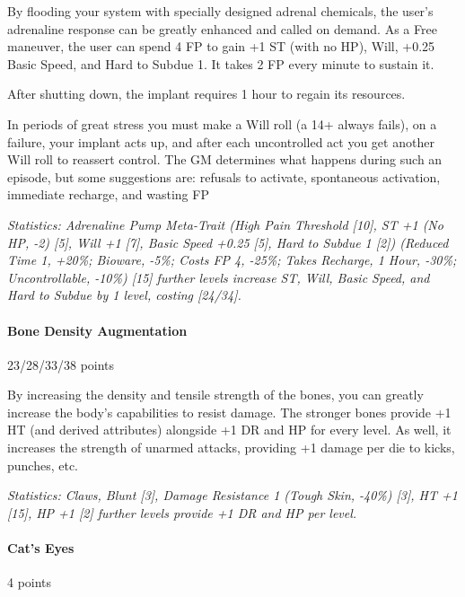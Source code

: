 \begin{multicols*}{3}
	By flooding your system with specially designed adrenal chemicals, the user's adrenaline response can be greatly enhanced and called on demand. As a Free maneuver, the user can spend 4 FP to gain +1 ST (with no HP), Will, +0.25 Basic Speed, and Hard to Subdue 1. It takes 2 FP every minute to sustain it. 
	
	After shutting down, the implant requires 1 hour to regain its resources. 
	
	In periods of great stress you  must make a Will roll (a 14+ always fails), on a failure, your implant acts up, and after each uncontrolled act you get another Will roll to reassert control. The GM determines what happens during such an episode, but some suggestions are: refusals to activate, spontaneous activation, immediate recharge, and wasting FP
	
	\textit{\textcolor{OliveGreen}{Statistics: Adrenaline Pump Meta-Trait (High Pain Threshold [10], ST +1 (No HP, -2) [5], Will +1 [7], Basic Speed +0.25 [5], Hard to Subdue 1 [2]) (Reduced Time 1, +20\%; Bioware, -5\%; Costs FP 4, -25\%; Takes Recharge, 1 Hour, -30\%; Uncontrollable,  -10\%) [15] further levels increase ST, Will, Basic Speed, and Hard to Subdue by 1 level, costing  [24/34].}}
	
	\paragraph{Bone Density Augmentation}
	\begin{flushright}
		23/28/33/38 points
	\end{flushright}
	
	By increasing the density and tensile strength of the bones, you can greatly increase the body's capabilities to resist damage. The stronger bones provide +1 HT (and derived attributes) alongside +1 DR and HP for every level. As well, it increases the strength of unarmed attacks, providing +1 damage per die to kicks, punches, etc.
	
	\textit{\textcolor{OliveGreen}{Statistics: Claws, Blunt [3], Damage Resistance 1 (Tough Skin, -40\%) [3], HT +1 [15], HP +1 [2] further levels provide +1 DR and HP per level.}}
	
	\paragraph{Cat's Eyes}
	\begin{flushright}
		4 points
	\end{flushright}
	

\end{multicols*}
